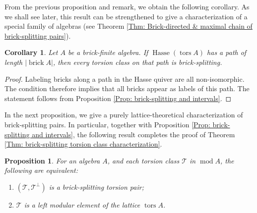 \documentclass{amsart}
\theoremstyle{thmstyle}
\newtheorem{proposition}[thm]{Proposition}
\newtheorem{corollary}[thm]{Corollary}
\theoremstyle{exstyle}
\theoremstyle{defstyle}
\theoremstyle{remstyle}
\theoremstyle{remstyle}
\DeclareMathOperator*{\modu}{mod}
\DeclareMathOperator*{\brick}{brick}
\DeclareMathOperator*{\tors}{tors}
\DeclareMathOperator*{\Hasse}{Hasse}
\begin{document}
From the previous proposition and remark, we obtain the following corollary. As we shall see later, this result can be strengthened to give a characterization of a special family of algebras (see Theorem \ref{Thm: Brick-directed & maximal chain of brick-splitting pairs}).

\begin{corollary}
Let $A$ be a brick-finite algebra. If $\Hasse(\tors A)$ has a path of length $|{\brick A}|$, then every torsion class on that path is brick-splitting.
\end{corollary}
\begin{proof}
Labeling bricks along a path in the Hasse quiver are all non-isomorphic. The condition therefore implies that all bricks appear as labels of this path. The statement follows from Proposition \ref{Prop: brick-splitting and intervals}.
\end{proof}

In the next proposition, we give a purely lattice-theoretical characterization of brick-splitting pairs. In particular, together with Proposition \ref{Prop: brick-splitting and intervals}, the following result completes the proof of Theorem \ref{Thm: brick-splitting torsion class characterization}.

\begin{proposition}\label{Prop: brick-splitting is left modular}
For an algebra $A$, and each torsion class $\mathcal{T}$ in $\modu A$, the following are equivalent:
\begin{enumerate}
    \item $(\mathcal{T}, \mathcal{T}^\perp)$ is a brick-splitting torsion pair;
    \item $\mathcal{T}$ is a left modular element of the lattice $\tors A$.
\end{enumerate}
\end{proposition}
\end{document}
